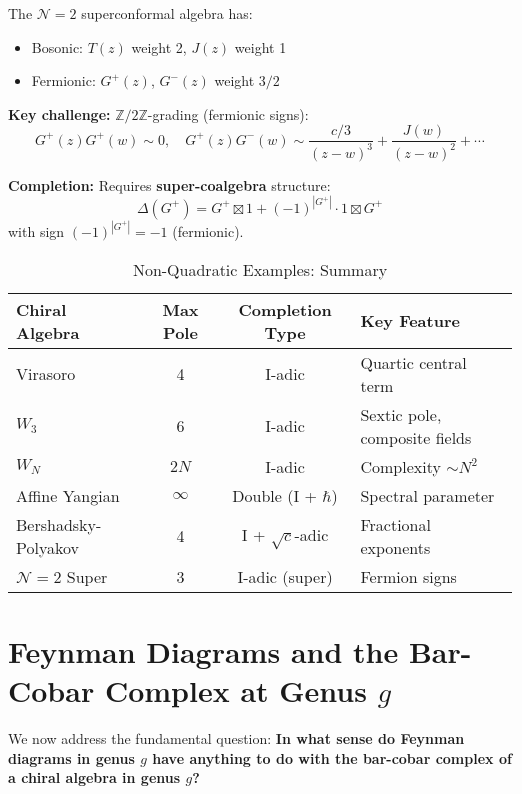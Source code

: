 \begin{example}
\label{ex:n2-superconformal}

The $\mathcal{N}=2$ superconformal algebra has:
\begin{itemize}
\item Bosonic: $T(z)$ weight 2, $J(z)$ weight 1
\item Fermionic: $G^+(z)$, $G^-(z)$ weight $3/2$
\end{itemize}

\textbf{Key challenge:} $\mathbb{Z}/2\mathbb{Z}$-grading (fermionic signs):
$$G^+(z)G^+(w) \sim 0, \quad G^+(z)G^-(w) \sim \frac{c/3}{(z-w)^3} + \frac{J(w)}{(z-w)^2} + \cdots$$

\textbf{Completion:} Requires \textbf{super-coalgebra} structure:
$$\Delta(G^+) = G^+ \boxtimes 1 + (-1)^{|G^+|} \cdot 1 \boxtimes G^+$$
with sign $(-1)^{|G^+|} = -1$ (fermionic).
\end{example}


\begin{table}[h]
\centering
\caption{Non-Quadratic Examples: Summary}
\begin{tabular}{|l|c|c|l|}
\hline
\textbf{Chiral Algebra} & \textbf{Max Pole} & \textbf{Completion Type} & \textbf{Key Feature} \\
\hline
Virasoro & 4 & I-adic & Quartic central term \\
$W_3$ & 6 & I-adic & Sextic pole, composite fields \\
$W_N$ & $2N$ & I-adic & Complexity $\sim N^2$ \\
Affine Yangian & $\infty$ & Double (I + $\hbar$) & Spectral parameter \\
Bershadsky-Polyakov & 4 & I + $\sqrt{c}$-adic & Fractional exponents \\
$\mathcal{N}=2$ Super & 3 & I-adic (super) & Fermion signs \\
\hline
\end{tabular}
\end{table}

\section{Feynman Diagrams and the Bar-Cobar Complex at Genus $g$}
\label{sec:feynman_genus_g}

We now address the fundamental question: \textbf{In what sense do Feynman diagrams
in genus $g$ have anything to do with the bar-cobar complex of a chiral algebra in
genus $g$?}


